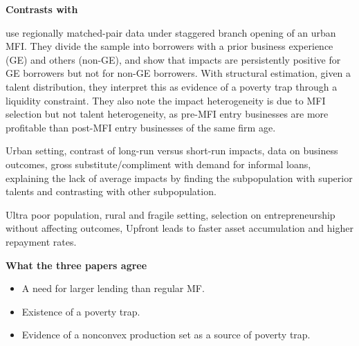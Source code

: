 \noindent
\textbf{\textbf{Contrasts with \citet{Banerjee2019MFPovertyTrap}}}

	\citet{Banerjee2019MFPovertyTrap} use regionally matched-pair data under staggered branch opening of an urban MFI. They divide the sample into borrowers with a prior business experience (GE) and others (non-GE), and show that impacts are persistently positive for GE borrowers but not for non-GE borrowers. With structural estimation, given a talent distribution, they interpret this as evidence of a poverty trap through a liquidity constraint. They also note the impact heterogeneity is due to MFI selection but not talent heterogeneity, as pre-MFI entry businesses are more profitable than post-MFI entry businesses of the same firm age. 

\begin{description}
\vspace{1.0ex}\setlength{\itemsep}{1.0ex}\setlength{\baselineskip}{12pt}
\item[their strength]	Urban setting, contrast of long-run versus short-run impacts, data on business outcomes, gross substitute/compliment with demand for informal loans, explaining the lack of average impacts by finding the subpopulation with superior talents and contrasting with other subpopulation.
\item[our strength]	Ultra poor population, rural and fragile setting, selection on entrepreneurship without affecting outcomes, \textsf{Upfront} leads to faster asset accumulation and higher repayment rates.
\end{description}

\noindent
\textbf{What the three papers agree}

\begin{itemize}
\vspace{1.0ex}\setlength{\itemsep}{1.0ex}\setlength{\baselineskip}{12pt}
\item	A need for larger lending than regular MF.
\item	Existence of a poverty trap.
\item	Evidence of a nonconvex production set as a source of poverty trap.
\end{itemize}

\newpage
\setcounter{tocdepth}{3}
\tableofcontents
\newpage

\setlength{\parindent}{1em}
\vspace{2ex}









